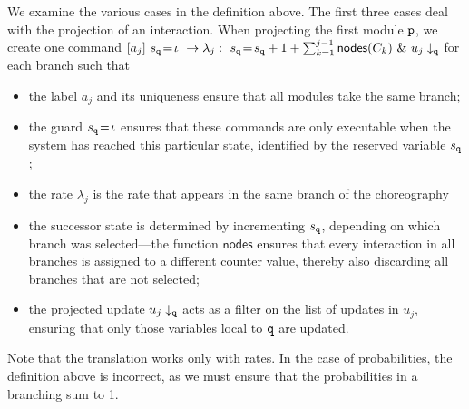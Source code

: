     We examine the various cases in the definition above. The first
    three cases deal with the projection of an interaction. When
    projecting the first module \( \mathtt{p} \), we create one command
    $[a_j]\ s_{\mathtt{q}}\!=\! \iota\ \rightarrow \lambda_j:\ s_{\mathtt{q}}\!=\!  s_{\mathtt{q}}
      +1+\sum_{k=1}^{j-1}\mathsf{nodes}({C_k})\ \&\ u_j\downarrow_{\mathtt{q}}$ for each branch such that
    \begin{itemize}
    \item the label $a_j$ and its uniqueness ensure that all modules
      take the same branch;
    \item the guard $s_{\mathtt{q}}\!=\! \iota$ ensures that these
      commands are only executable when the system has reached this
      particular state, identified by the reserved variable
      $s_{\mathtt{q}}$;
    \item the rate $\lambda_j$ is the rate that appears in the same
      branch of the choreography
    \item the successor state is determined by incrementing
      $s_{\mathtt{q}}$, depending on which branch was selected—the
      function $\mathsf{nodes}$ ensures that every interaction in all
      branches is assigned to a different counter value, thereby also
      discarding all branches that are not selected;
    \item the projected update $u_j\downarrow_{\mathtt{q}}$ acts as a
      filter on the list of updates in $u_j$, ensuring that only those
      variables local to $\mathtt{q}$ are updated.
    \end{itemize}
    Note that the translation works only with rates. In the case of
    probabilities, the definition above is incorrect, as we must
    ensure that the probabilities in a branching sum to 1.

